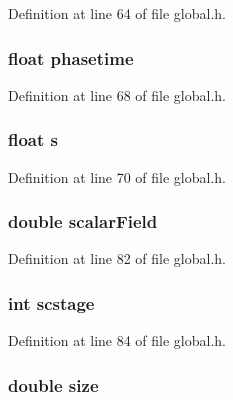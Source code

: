 Definition at line 64 of file global.\-h.

\hypertarget{structcellData_afe1297f954440c453b59fcb06992dbd5}{
\subsubsection[{phasetime}]{\setlength{\rightskip}{0pt plus 5cm}float phasetime}}\label{structcellData_afe1297f954440c453b59fcb06992dbd5}


Definition at line 68 of file global.\-h.

\hypertarget{structcellData_a874f74a4dc1c9a0cd9c6e0d79c298f55}{
\subsubsection[{s}]{\setlength{\rightskip}{0pt plus 5cm}float s}}\label{structcellData_a874f74a4dc1c9a0cd9c6e0d79c298f55}


Definition at line 70 of file global.\-h.

\hypertarget{structcellData_a0045a5036d7f3f873fe33380932d4313}{
\subsubsection[{scalar\-Field}]{\setlength{\rightskip}{0pt plus 5cm}double scalar\-Field}}\label{structcellData_a0045a5036d7f3f873fe33380932d4313}


Definition at line 82 of file global.\-h.

\hypertarget{structcellData_addbb21027771706513a66fdf00c123f3}{
\subsubsection[{scstage}]{\setlength{\rightskip}{0pt plus 5cm}int scstage}}\label{structcellData_addbb21027771706513a66fdf00c123f3}


Definition at line 84 of file global.\-h.

\hypertarget{structcellData_aba3c5d750d5dbd6e86c11ecaca62885e}{
\subsubsection[{size}]{\setlength{\rightskip}{0pt plus 5cm}double size}}\label{structcellData_aba3c5d750d5dbd6e86c11ecaca62885e}


